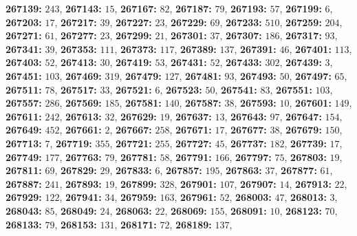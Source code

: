 \textsf{\bfseries 267139:} $243$, \textsf{\bfseries 267143:} $15$, \textsf{\bfseries 267167:} $82$, \textsf{\bfseries 267187:} $79$, \textsf{\bfseries 267193:} $57$, \textsf{\bfseries 267199:} $6$, \textsf{\bfseries 267203:} $17$, \textsf{\bfseries 267217:} $39$, \textsf{\bfseries 267227:} $23$, \textsf{\bfseries 267229:} $69$, \textsf{\bfseries 267233:} $510$, \textsf{\bfseries 267259:} $204$, \textsf{\bfseries 267271:} $61$, \textsf{\bfseries 267277:} $23$, \textsf{\bfseries 267299:} $21$, \textsf{\bfseries 267301:} $37$, \textsf{\bfseries 267307:} $186$, \textsf{\bfseries 267317:} $93$, \textsf{\bfseries 267341:} $39$, \textsf{\bfseries 267353:} $111$, \textsf{\bfseries 267373:} $117$, \textsf{\bfseries 267389:} $137$, \textsf{\bfseries 267391:} $46$, \textsf{\bfseries 267401:} $113$, \textsf{\bfseries 267403:} $52$, \textsf{\bfseries 267413:} $30$, \textsf{\bfseries 267419:} $53$, \textsf{\bfseries 267431:} $52$, \textsf{\bfseries 267433:} $302$, \textsf{\bfseries 267439:} $3$, \textsf{\bfseries 267451:} $103$, \textsf{\bfseries 267469:} $319$, \textsf{\bfseries 267479:} $127$, \textsf{\bfseries 267481:} $93$, \textsf{\bfseries 267493:} $50$, \textsf{\bfseries 267497:} $65$, \textsf{\bfseries 267511:} $78$, \textsf{\bfseries 267517:} $33$, \textsf{\bfseries 267521:} $6$, \textsf{\bfseries 267523:} $50$, \textsf{\bfseries 267541:} $83$, \textsf{\bfseries 267551:} $103$, \textsf{\bfseries 267557:} $286$, \textsf{\bfseries 267569:} $185$, \textsf{\bfseries 267581:} $140$, \textsf{\bfseries 267587:} $38$, \textsf{\bfseries 267593:} $10$, \textsf{\bfseries 267601:} $149$, \textsf{\bfseries 267611:} $242$, \textsf{\bfseries 267613:} $32$, \textsf{\bfseries 267629:} $19$, \textsf{\bfseries 267637:} $13$, \textsf{\bfseries 267643:} $97$, \textsf{\bfseries 267647:} $154$, \textsf{\bfseries 267649:} $452$, \textsf{\bfseries 267661:} $2$, \textsf{\bfseries 267667:} $258$, \textsf{\bfseries 267671:} $17$, \textsf{\bfseries 267677:} $38$, \textsf{\bfseries 267679:} $150$, \textsf{\bfseries 267713:} $7$, \textsf{\bfseries 267719:} $355$, \textsf{\bfseries 267721:} $255$, \textsf{\bfseries 267727:} $45$, \textsf{\bfseries 267737:} $182$, \textsf{\bfseries 267739:} $17$, \textsf{\bfseries 267749:} $177$, \textsf{\bfseries 267763:} $79$, \textsf{\bfseries 267781:} $58$, \textsf{\bfseries 267791:} $166$, \textsf{\bfseries 267797:} $75$, \textsf{\bfseries 267803:} $19$, \textsf{\bfseries 267811:} $69$, \textsf{\bfseries 267829:} $29$, \textsf{\bfseries 267833:} $6$, \textsf{\bfseries 267857:} $195$, \textsf{\bfseries 267863:} $37$, \textsf{\bfseries 267877:} $61$, \textsf{\bfseries 267887:} $241$, \textsf{\bfseries 267893:} $19$, \textsf{\bfseries 267899:} $328$, \textsf{\bfseries 267901:} $107$, \textsf{\bfseries 267907:} $14$, \textsf{\bfseries 267913:} $22$, \textsf{\bfseries 267929:} $122$, \textsf{\bfseries 267941:} $34$, \textsf{\bfseries 267959:} $163$, \textsf{\bfseries 267961:} $52$, \textsf{\bfseries 268003:} $47$, \textsf{\bfseries 268013:} $3$, \textsf{\bfseries 268043:} $85$, \textsf{\bfseries 268049:} $24$, \textsf{\bfseries 268063:} $22$, \textsf{\bfseries 268069:} $155$, \textsf{\bfseries 268091:} $10$, \textsf{\bfseries 268123:} $70$, \textsf{\bfseries 268133:} $79$, \textsf{\bfseries 268153:} $131$, \textsf{\bfseries 268171:} $72$, \textsf{\bfseries 268189:} $137$, 
